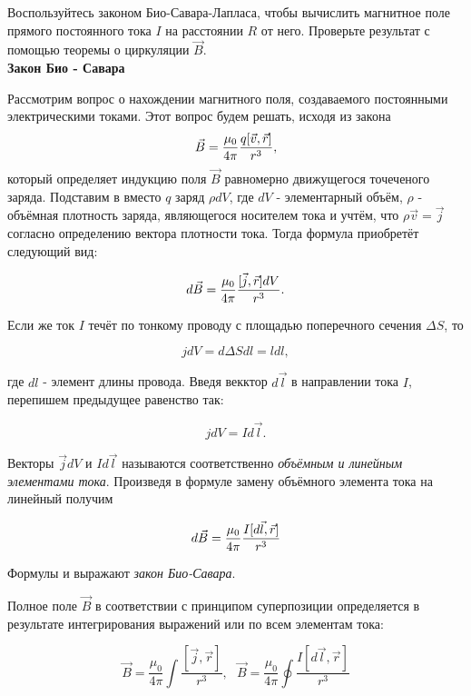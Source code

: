 \documentclass[__main__.tex]{subfiles}
\begin{document}
Воспользуйтесь законом Био-Савара-Лапласа, чтобы вычислить магнитное поле прямого постоянного тока $I$ на расстоянии $R$ от него. Проверьте результат с помощью теоремы о циркуляции $\vec{B}$.\\ 

\textbf{Закон Био - Савара}

	Рассмотрим вопрос о нахождении магнитного поля, создаваемого постоянными электрическими токами. Этот вопрос будем решать, исходя из закона 
	\begin{gather}
	\llabel{y1}
	\vec{B} = \frac{\mu_0}{4\pi} \frac{q[\vec{v},\vec{r}]}{r^3},
	\end{gather}
	который определяет индукцию поля $\vec{B}$ равномерно  движущегося точеченого заряда. Подставим в  вместо $q$ заряд $\rho dV$, где $dV$ - элементарный объём, $\rho$ - объёмная плотность заряда, являющегося носителем тока и учтём, что $\rho \vec{v} = \vec{j}$ согласно определению вектора плотности тока. Тогда формула  приобретёт следующий вид:
	
	\begin{gather}
	\llabel{y2}
	d\vec{B}= \frac{\mu_0}{4\pi} \frac{[\vec{j},\vec{r}] dV}{r^3}.
	\end{gather}
	
	Если же ток $I$ течёт по тонкому проводу с площадью поперечного сечения $\Delta S$, то 
	
	$$j dV = d \Delta S dl = l dl,$$
	
	где $dl$ - элемент длины провода. Введя векктор $d\vec{l}$ в направлении тока $I$, перепишем предыдущее равенство так:
	
	$$j dV = I d\vec{l}.$$
	
	Векторы $\vec{j} dV$ и $I d\vec{l}$ называются соответственно \textit{объёмным и линейным элементами тока}. Произведя в формуле  замену объёмного элемента тока на линейный получим
	
	\begin{gather}
	\llabel{y3}
		d\vec{B} = \frac{\mu_0}{4\pi} \frac{I[d\vec{l},\vec{r}]}{r^3}
	\end{gather}
	
	Формулы  и  выражают \textit{закон Био-Савара}.
	
	Полное поле $\vec{B}$ в соответствии с принципом суперпозиции определяется в результате интегрирования выражений  или  по всем элементам тока:
	
	$$\vec{B} = \frac{\mu_0}{4\pi} \int \frac{[\vec{j},\vec{r}]}{r^3}, \ \ \ \vec{B} = \frac{\mu_0}{4\pi}\oint \frac{I[d\vec{l},\vec{r}]}{r^3} $$
	
\end{document}
